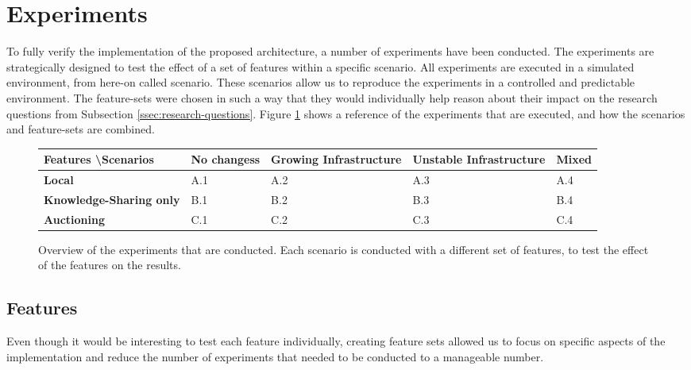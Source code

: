 \section{Experiments}
\label{sec:experiments}
To fully verify the implementation of the proposed architecture, a number of experiments have been conducted. The experiments are strategically designed to test the effect of a set of features within a specific scenario. All experiments are executed in a simulated environment, from here-on called scenario. These scenarios allow us to reproduce the experiments in a controlled and predictable environment. The feature-sets were chosen in such a way that they would individually help reason about their impact on the research questions from Subsection \ref{ssec:research-questions}. Figure \ref{fig:experiments} shows a reference of the experiments that are executed, and how the scenarios and feature-sets are combined.

\begin{figure}[H]
    \begin{adjustwidth}{-1cm}{}
        \centering
        \begin{tabularx}{1.2\textwidth}{l|l|X|X|l}
            \textbf{Features \textbackslash Scenarios} & \textbf{No changess} & \textbf{Growing \newline Infrastructure} & \textbf{Unstable \newline Infrastructure} & \textbf{Mixed} \\ \hline
            \textbf{Local}                             & A.1            & A.2                    & A.3                     & A.4   \\
            \textbf{Knowledge-Sharing only}            & B.1            & B.2                    & B.3                     & B.4   \\
            \textbf{Auctioning}                        & C.1            & C.2                    & C.3                     & C.4     
        \end{tabularx}
        
    \end{adjustwidth}
    \caption{\label{fig:experiments}Overview of the experiments that are conducted. Each scenario is conducted with a different set of features, to test the effect of the features on the results.}
\end{figure}

\subsection*{Features}
Even though it would be interesting to test each feature individually, creating feature sets allowed us to focus on specific aspects of the implementation and reduce the number of experiments that needed to be conducted to a manageable number. 

